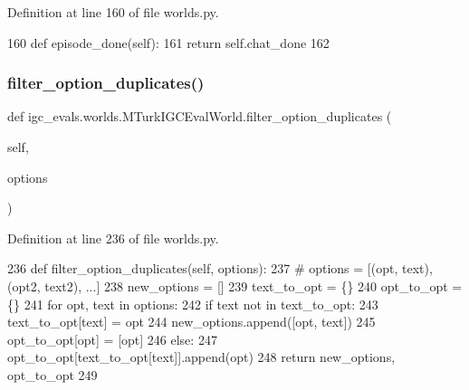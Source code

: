 Definition at line 160 of file worlds.\+py.


\begin{DoxyCode}
160     \textcolor{keyword}{def }episode\_done(self):
161         \textcolor{keywordflow}{return} self.chat\_done
162 
\end{DoxyCode}
\mbox{\label{classigc__evals_1_1worlds_1_1MTurkIGCEvalWorld_a93a8b179951ffcfac7c07da5da696e39}} 
\subsubsection{\texorpdfstring{filter\+\_\+option\+\_\+duplicates()}{filter\_option\_duplicates()}}
{\footnotesize\ttfamily def igc\+\_\+evals.\+worlds.\+M\+Turk\+I\+G\+C\+Eval\+World.\+filter\+\_\+option\+\_\+duplicates (\begin{DoxyParamCaption}\item[{}]{self,  }\item[{}]{options }\end{DoxyParamCaption})}



Definition at line 236 of file worlds.\+py.


\begin{DoxyCode}
236     \textcolor{keyword}{def }filter\_option\_duplicates(self, options):
237         \textcolor{comment}{# options = [(opt, text), (opt2, text2), ...]}
238         new\_options = []
239         text\_to\_opt = \{\}
240         opt\_to\_opt = \{\}
241         \textcolor{keywordflow}{for} opt, text \textcolor{keywordflow}{in} options:
242             \textcolor{keywordflow}{if} text \textcolor{keywordflow}{not} \textcolor{keywordflow}{in} text\_to\_opt:
243                 text\_to\_opt[text] = opt
244                 new\_options.append([opt, text])
245                 opt\_to\_opt[opt] = [opt]
246             \textcolor{keywordflow}{else}:
247                 opt\_to\_opt[text\_to\_opt[text]].append(opt)
248         \textcolor{keywordflow}{return} new\_options, opt\_to\_opt
249 
\end{DoxyCode}
\mbox{\label{classigc__evals_1_1worlds_1_1MTurkIGCEvalWorld_af15ae6901cfd80ff6b3253294f0f46c6}} 

